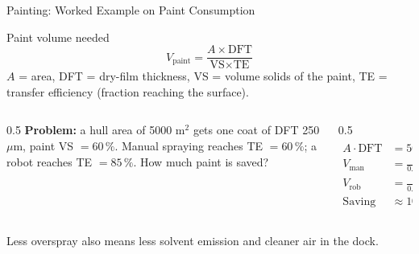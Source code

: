\documentclass[aspectratio=169]{beamer}
\begin{document}
	\begin{frame}{Painting: Worked Example on Paint Consumption}
		\begin{block}{Paint volume needed}
			\[
			V_{\text{paint}} = \frac{A \times \text{DFT}}{\text{VS} \times \text{TE}}
			\]
			$A$ = area, DFT = dry-film thickness, VS = volume solids of the paint, TE = transfer efficiency (fraction reaching the surface).
		\end{block}
		\begin{columns}[T]
			\begin{column}{0.5\textwidth}
				\textbf{Problem:} a hull area of 5000 m$^2$ gets one coat of DFT 250 $\mu$m, paint VS $= 60\,\%$. Manual spraying reaches TE $= 60\,\%$; a robot reaches TE $= 85\,\%$. How much paint is saved?
			\end{column}
			\begin{column}{0.5\textwidth}
				\small
				\begin{align*}
					A\cdot\text{DFT} &= 5000\times250\times10^{-6} = 1.25\ \text{m}^3\\
					V_{\text{man}} &= \frac{1.25}{0.6\times0.6} = 3.47\ \text{m}^3 \approx 3472\ \text{L}\\
					V_{\text{rob}} &= \frac{1.25}{0.6\times0.85} = 2.45\ \text{m}^3 \approx 2451\ \text{L}\\
					\text{Saving} &\approx \boxed{1021\ \text{L}\ (29\,\%)}
				\end{align*}
			\end{column}
		\end{columns}
		\vspace{0.1cm}
		\footnotesize\centering Less overspray also means less solvent emission and cleaner air in the dock.
	\end{frame}

\end{document}
